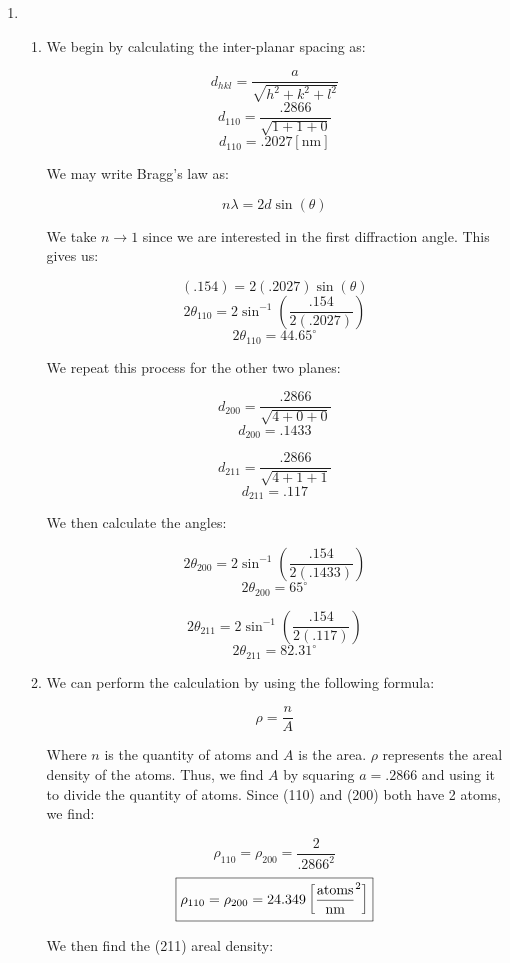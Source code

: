 \begin{enumerate}

  \item

    \begin{enumerate}

      \item We begin by calculating the inter-planar spacing as:

        $$d_{hkl}=\frac{a}{\sqrt{h^2+k^2+l^2}}$$
        $$d_{110}=\frac{.2866}{\sqrt{1+1+0}}$$
        $$\boxed{d_{110}=.2027[\si{\nano\meter}]}$$

        We may write Bragg's law as:

        $$n\lambda=2d\sin(\theta)$$

        We take $n\to1$ since we are interested in the first diffraction angle. This gives us:

        $$(.154)=2(.2027)\sin(\theta)$$
        $$2\theta_{110}=2\sin^{-1}\left( \frac{.154}{2(.2027)} \right)$$
        $$\boxed{2\theta_{110}=44.65^{\circ}}$$

        We repeat this process for the other two planes:
        
        $$d_{200}=\frac{.2866}{\sqrt{4+0+0}}$$
        $$\boxed{d_{200}=.1433}$$

        $$d_{211}=\frac{.2866}{\sqrt{4+1+1}}$$
        $$\boxed{d_{211}=.117}$$

        We then calculate the angles:

        $$2\theta_{200}=2\sin^{-1}\left( \frac{.154}{2(.1433)} \right)$$
        $$\boxed{2\theta_{200}=65^{\circ}}$$

        $$2\theta_{211}=2\sin^{-1}\left( \frac{.154}{2(.117)} \right)$$
        $$\boxed{2\theta_{211}=82.31^{\circ}}$$

      \item We can perform the calculation by using the following formula:

        $$\rho=\frac{n}{A}$$

        Where $n$ is the quantity of atoms and $A$ is the area. $\rho$ represents the areal density of the atoms. Thus, we find $A$ by squaring $a=.2866$ and using it to divide the quantity of atoms. Since (110) and (200) both have 2 atoms, we find:

        $$\rho_{110}=\rho_{200}=\frac{2}{.2866^2}$$
        $$\boxed{\rho_{110}=\rho_{200}=24.349\left[ \si{atoms\over\nano\meter\squared} \right]}$$

        We then find the (211) areal density:


\end{enumerate}
\end{enumerate}
